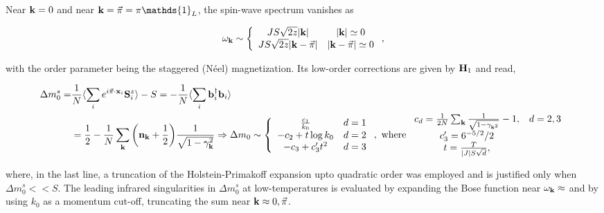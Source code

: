 Near ${\bf k} = 0$ and near ${\bf k} = \vec{\pi} = \pi \mathds{1}_{L}$, the spin-wave spectrum vanishes as 

\begin{equation}
    \omega_{{\bf k}} \sim \left\{
    \begin{array}{cc}
         JS \sqrt{2z} |{\bf k}| & |{\bf k}| \simeq 0 \\
         JS \sqrt{2z} |{\bf k} - \vec{\pi}| & |{\bf k} - \vec{\pi}| \simeq 0 
    \end{array}
    \right.,
\end{equation}

with the order parameter being the staggered (Néel) magnetization. Its low-order corrections are given by ${\bf H}_1$ and read, 

\begin{equation}
    \begin{split}
        \Delta m_0^s =& \frac{1}{N} \langle \sum_{i} e^{i \vec{\pi} \cdot {\bf x}_i} {\bf S}_i^z \rangle - S = - \frac{1}{N} \langle \sum_{i} {\bf b}_i^\dagger {\bf b}_i \rangle \\
        &= \frac{1}{2} - \frac{1}{N} \sum_{{\bf k}} \bigg({\bf n}_{{\bf k}} + \frac{1}{2} \bigg) \frac{1}{\sqrt{1-\gamma_{{\bf k}}^2}} \Rightarrow \Delta m_0 \sim \left\{
        \begin{array}{cc}
             \frac{c_1}{k_0} & d=1 \\
             -c_2 + t \log k_0 & d=2 \\
             -c_3 + c_3' t^2 & d=3
        \end{array}
        \right., \textnormal{ where } \begin{array}{cc}
             c_d = \frac{1}{2N} \sum_{{\bf k}} \frac{1}{\sqrt{1 - \gamma_{{\bf k}^2}}}-1, & d = 2,3 \\
             c_3' = 6^{-5/2}/2 \\
             t = \frac{T}{|J| S \sqrt{d}},
        \end{array} 
    \end{split}
\end{equation}

where, in the last line, a truncation of the Holstein-Primakoff expansion upto quadratic order was employed and is justified only when $\Delta m_0^s << S$. The leading infrared singularities in $\Delta m_0^s$ at low-temperatures is evaluated by expanding the Bose function near ${\bf \omega}_{\bf k} \approx$ and by using $k_0$ as a momentum cut-off, truncating the sum near ${\bf k} \approx 0, \vec{\pi}$. \\

